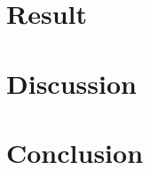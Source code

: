 \section{Result}
















\section{Discussion}
















\section{Conclusion}






















